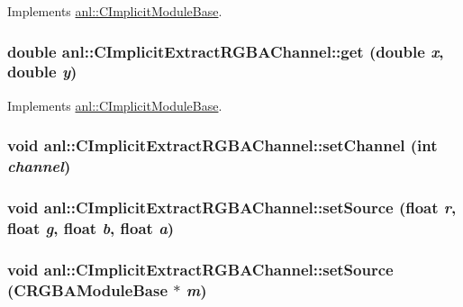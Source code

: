 Implements \hyperlink{classanl_1_1CImplicitModuleBase_ac17d592612c82ba3d47f9229a00b1fe3}{anl::CImplicitModuleBase}.\hypertarget{classanl_1_1CImplicitExtractRGBAChannel_a8770c4c419956bfc7a1ddf7e40fe0c66}{
\subsubsection[{get}]{\setlength{\rightskip}{0pt plus 5cm}double anl::CImplicitExtractRGBAChannel::get (double {\em x}, \/  double {\em y})}}
\label{classanl_1_1CImplicitExtractRGBAChannel_a8770c4c419956bfc7a1ddf7e40fe0c66}


Implements \hyperlink{classanl_1_1CImplicitModuleBase_ab88f8a1822dcfbc13ba5230318b0acd1}{anl::CImplicitModuleBase}.\hypertarget{classanl_1_1CImplicitExtractRGBAChannel_a40f3d8750326e262febb032477815ff6}{
\subsubsection[{setChannel}]{\setlength{\rightskip}{0pt plus 5cm}void anl::CImplicitExtractRGBAChannel::setChannel (int {\em channel})}}
\label{classanl_1_1CImplicitExtractRGBAChannel_a40f3d8750326e262febb032477815ff6}
\hypertarget{classanl_1_1CImplicitExtractRGBAChannel_a4b7881dc62acc7eeeb34f041cedbdbd7}{
\subsubsection[{setSource}]{\setlength{\rightskip}{0pt plus 5cm}void anl::CImplicitExtractRGBAChannel::setSource (float {\em r}, \/  float {\em g}, \/  float {\em b}, \/  float {\em a})}}
\label{classanl_1_1CImplicitExtractRGBAChannel_a4b7881dc62acc7eeeb34f041cedbdbd7}
\hypertarget{classanl_1_1CImplicitExtractRGBAChannel_aab9b09f4de1e342846ec0bff2f636d0f}{
\subsubsection[{setSource}]{\setlength{\rightskip}{0pt plus 5cm}void anl::CImplicitExtractRGBAChannel::setSource ({\bf CRGBAModuleBase} $\ast$ {\em m})}}
\label{classanl_1_1CImplicitExtractRGBAChannel_aab9b09f4de1e342846ec0bff2f636d0f}


